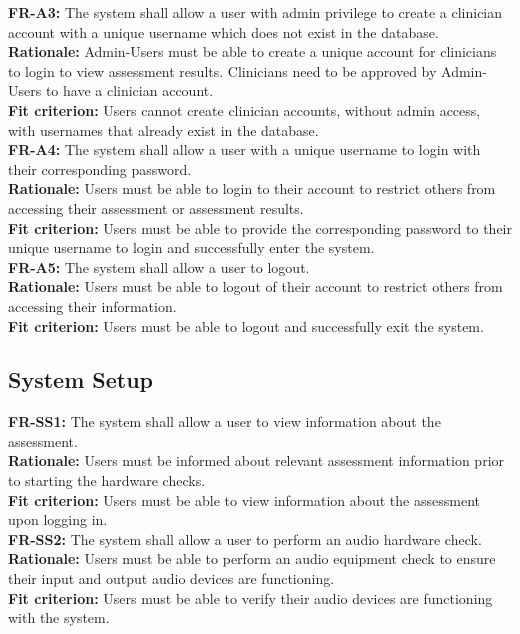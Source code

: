 \documentclass[12pt]{article}
\begin{document}
\textbf{FR-A3: } The system shall allow a user with admin privilege to create a clinician account with a unique username which does not exist in the database.\\
\textbf{Rationale: } Admin-Users must be able to create a unique account for clinicians to login to view assessment results. Clinicians need to be approved by Admin-Users to have a clinician account.\\
\textbf{Fit criterion: } Users cannot create clinician accounts, without admin access, with usernames that already exist in the database.\\

\textbf{FR-A4: } The system shall allow a user with a unique username to login with their corresponding password.\\
\textbf{Rationale: } Users must be able to login to their account to restrict others from accessing their assessment or assessment results.\\
\textbf{Fit criterion: } Users must be able to provide the corresponding password to their unique username to login and successfully enter the system.\\

\textbf{FR-A5: } The system shall allow a user to logout.\\
\textbf{Rationale: } Users must be able to logout of their account to restrict others from accessing their information.\\
\textbf{Fit criterion: } Users must be able to logout and successfully exit the system.\\

\subsection{System Setup}
\textbf{FR-SS1: } The system shall allow a user to view information about the assessment.\\
\textbf{Rationale: } Users must be informed about relevant assessment information prior to starting the hardware checks.\\
\textbf{Fit criterion: } Users must be able to view information about the assessment upon logging in.\\

\textbf{FR-SS2: } The system shall allow a user to perform an audio hardware check.\\
\textbf{Rationale: } Users must be able to perform an audio equipment check to ensure their input and output audio devices are functioning.\\
\textbf{Fit criterion: } Users must be able to verify their audio devices are functioning with the system.\\
\end{document}
